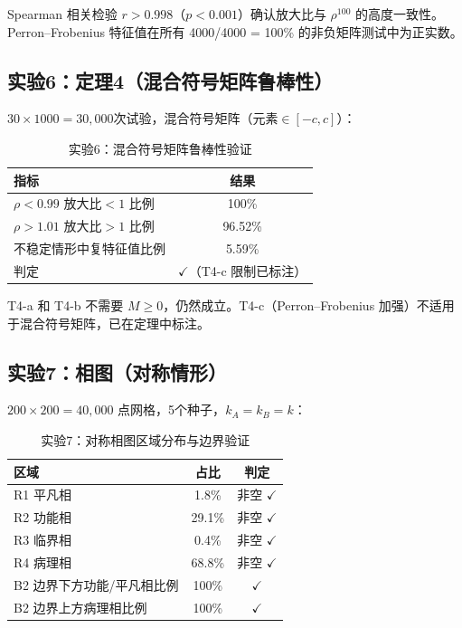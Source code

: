 \documentclass[12pt,a4paper]{article}
\theoremstyle{definition}
\begin{document}
Spearman 相关检验 $r > 0.998$（$p < 0.001$）确认放大比与 $\rho^{100}$ 的高度一致性。Perron--Frobenius 特征值在所有 4000/4000 = 100\% 的非负矩阵测试中为正实数。

\subsection{实验6：定理4（混合符号矩阵鲁棒性）}

$30 \times 1000 = 30{,}000$次试验，混合符号矩阵（元素$\in [-c, c]$）：

\begin{table}[htbp]
\centering
\caption{实验6：混合符号矩阵鲁棒性验证}
\label{tab:exp6}
\begin{tabular}{lc}
\toprule
指标 & 结果 \\
\midrule
$\rho < 0.99$ 放大比$< 1$ 比例 & 100\% \\
$\rho > 1.01$ 放大比$> 1$ 比例 & 96.52\% \\
不稳定情形中复特征值比例 & 5.59\% \\
\midrule
判定 & $\checkmark$（T4-c 限制已标注） \\
\bottomrule
\end{tabular}
\end{table}

T4-a 和 T4-b 不需要 $M \geq 0$，仍然成立。T4-c（Perron--Frobenius 加强）不适用于混合符号矩阵，已在定理中标注。

\subsection{实验7：相图（对称情形）}

$200 \times 200 = 40{,}000$ 点网格，5个种子，$k_A = k_B = k$：

\begin{table}[htbp]
\centering
\caption{实验7：对称相图区域分布与边界验证}
\label{tab:exp7}
\begin{tabular}{lcc}
\toprule
区域 & 占比 & 判定 \\
\midrule
R1 平凡相 & 1.8\% & 非空 $\checkmark$ \\
R2 功能相 & 29.1\% & 非空 $\checkmark$ \\
R3 临界相 & 0.4\% & 非空 $\checkmark$ \\
R4 病理相 & 68.8\% & 非空 $\checkmark$ \\
\midrule
B2 边界下方功能/平凡相比例 & 100\% & $\checkmark$ \\
B2 边界上方病理相比例 & 100\% & $\checkmark$ \\
\bottomrule
\end{tabular}
\end{table}
\end{document}
